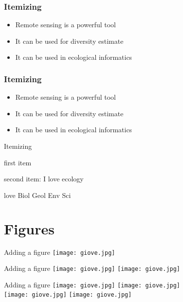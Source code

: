 \documentclass{beamer}
\begin{document}
\begin{frame}
 \frametitle{Itemizing}
 \begin{itemize}
  \item<1> Remote sensing is a powerful tool
  \item<2> It can be used for diversity estimate
  \item<3> It can be used in ecological informatics
 \end{itemize}
\end{frame}

\begin{frame}
 \frametitle{Itemizing}
 \begin{itemize}
  \item<1-> Remote sensing is a powerful tool
  \item<2-> It can be used for diversity estimate
  \item<3-> It can be used in ecological informatics
 \end{itemize}
\end{frame}

\begin{frame}{Itemizing}
\begin{itemize}
\tiny{
    \item<1-> first item
    \item<2-> second item: I love ecology
    \item<3-> love Biol Geol Env Sci}
\end{itemize}
\end{frame}

\section{Figures}
\begin{frame}{Adding a figure}
\centering
 \texttt{[image: giove.jpg]}
\end{frame}

\begin{frame}{Adding a figure}
\centering
 \texttt{[image: giove.jpg]}
 \texttt{[image: giove.jpg]}
\end{frame}

\begin{frame}{Adding a figure}
\centering
 \texttt{[image: giove.jpg]}
 \texttt{[image: giove.jpg]}\\
 \texttt{[image: giove.jpg]}
  \texttt{[image: giove.jpg]}\\
\end{frame}
\end{document}
